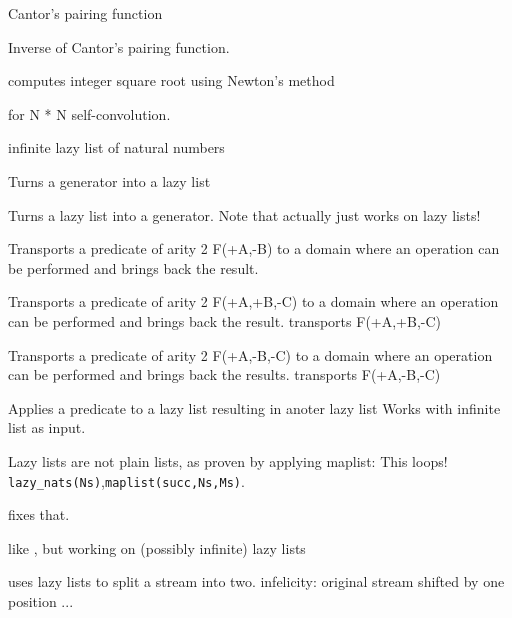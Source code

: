 \documentclass[11pt]{article}
\begin{document}
\begin{description}
Cantor's pairing function

Inverse of Cantor's pairing function.

computes integer square root using Newton's method

 for N * N self-convolution.

infinite lazy list of natural numbers

Turns a generator into a lazy list 

Turns a lazy list into a generator.
Note that  actually just works on lazy lists!

Transports a predicate of arity 2 F(+A,-B) to a domain where
an operation can be performed and brings back the result.

Transports a predicate of arity 2 F(+A,+B,-C) to a domain where
an operation can be performed and brings back the result.
transports F(+A,+B,-C) 

Transports a predicate of arity 2 F(+A,-B,-C) to a domain where
an operation can be performed and brings back the results.
transports F(+A,-B,-C) 

Applies a predicate to a lazy list resulting in anoter lazy list
Works with infinite list as input.

Lazy lists are not plain lists, as proven by applying maplist:
This loops!
\Sdirective{}\verb$lazy_nats(Ns)$,\verb$maplist(succ,Ns,Ms)$.

 fixes that.

like , but working on (possibly infinite) lazy lists

 uses lazy lists to split a stream into two.
infelicity: original stream shifted by one position ...


\end{description}
\end{document}
